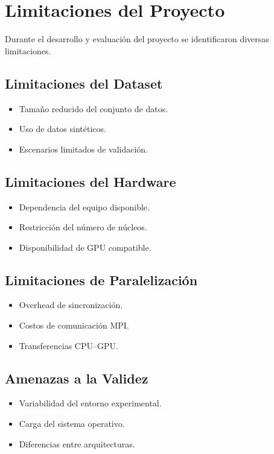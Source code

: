 \chapter{Limitaciones del Proyecto}

Durante el desarrollo y evaluación del proyecto se identificaron diversas limitaciones.

\section{Limitaciones del Dataset}

\begin{itemize}
    \item Tamaño reducido del conjunto de datos.
    \item Uso de datos sintéticos.
    \item Escenarios limitados de validación.
\end{itemize}

\section{Limitaciones del Hardware}

\begin{itemize}
    \item Dependencia del equipo disponible.
    \item Restricción del número de núcleos.
    \item Disponibilidad de GPU compatible.
\end{itemize}

\section{Limitaciones de Paralelización}

\begin{itemize}
    \item Overhead de sincronización.
    \item Costos de comunicación MPI.
    \item Transferencias CPU--GPU.
\end{itemize}

\section{Amenazas a la Validez}

\begin{itemize}
    \item Variabilidad del entorno experimental.
    \item Carga del sistema operativo.
    \item Diferencias entre arquitecturas.
\end{itemize}